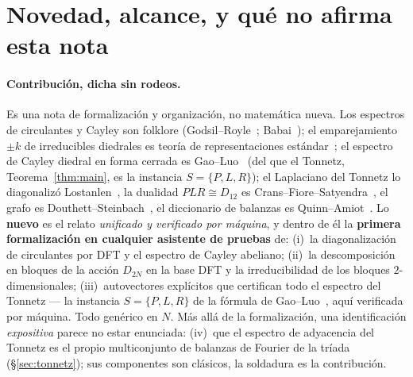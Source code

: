 \documentclass[11pt]{article}
\begin{document}
\section{Novedad, alcance, y qu\'e no afirma esta nota}\label{sec:novelty}

\paragraph{Contribuci\'on, dicha sin rodeos.} Es una nota de formalizaci\'on y organizaci\'on, no
matem\'atica nueva. Los espectros de circulantes y Cayley son folklore (Godsil--Royle~\cite{GR};
Babai~\cite{Babai}); el emparejamiento $\pm k$ de irreducibles diedrales es teor\'ia de representaciones
est\'andar~\cite{Diaconis}; el espectro de Cayley diedral en forma cerrada es Gao--Luo~\cite{GaoLuo} (del
que el Tonnetz, Teorema~\ref{thm:main}, es la instancia $S=\{P,L,R\}$); el Laplaciano del Tonnetz lo
diagonaliz\'o Lostanlen~\cite{Lostanlen}, la dualidad $PLR\cong D_{12}$ es Crans--Fiore--Satyendra~\cite{CFS},
el grafo es Douthett--Steinbach~\cite{DS}, el diccionario de balanzas es Quinn--Amiot~\cite{Quinn,Amiot}. Lo \textbf{nuevo} es el relato
\emph{unificado y verificado por m\'aquina}, y dentro de \'el la \textbf{primera formalizaci\'on en cualquier
asistente de pruebas} de: (i)~la diagonalizaci\'on de circulantes por DFT y el espectro de Cayley abeliano;
(ii)~la descomposici\'on en bloques de la acci\'on $D_{2N}$ en la base DFT y la irreducibilidad de los
bloques $2$-dimensionales; (iii)~autovectores expl\'icitos que certifican todo el espectro del Tonnetz --- la
instancia $S=\{P,L,R\}$ de la f\'ormula de Gao--Luo~\cite{GaoLuo}, aqu\'i verificada por m\'aquina. Todo
gen\'erico en $N$. M\'as all\'a de la formalizaci\'on, una identificaci\'on \emph{expositiva} parece no estar enunciada:
(iv)~que el espectro de adyacencia del Tonnetz es el propio multiconjunto de balanzas de Fourier de la
tr\'iada (\S\ref{sec:tonnetz}); sus componentes son cl\'asicos, la soldadura es la contribuci\'on.
\end{document}
